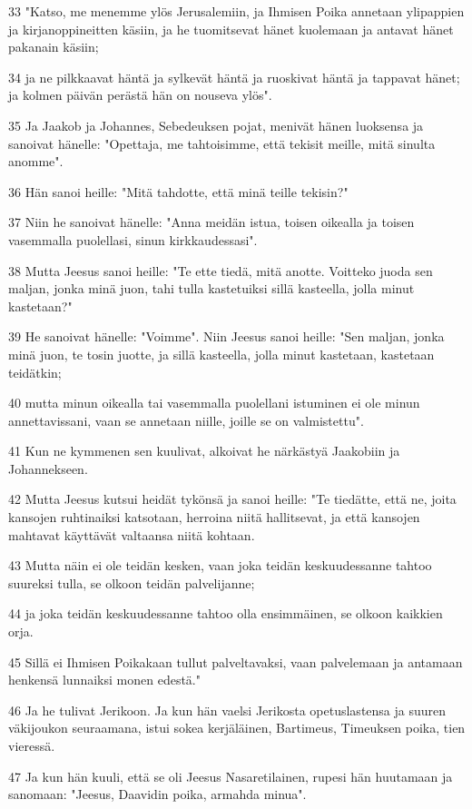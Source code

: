 \par 33 "Katso, me menemme ylös Jerusalemiin, ja Ihmisen Poika annetaan ylipappien ja kirjanoppineitten käsiin, ja he tuomitsevat hänet kuolemaan ja antavat hänet pakanain käsiin;
\par 34 ja ne pilkkaavat häntä ja sylkevät häntä ja ruoskivat häntä ja tappavat hänet; ja kolmen päivän perästä hän on nouseva ylös".
\par 35 Ja Jaakob ja Johannes, Sebedeuksen pojat, menivät hänen luoksensa ja sanoivat hänelle: "Opettaja, me tahtoisimme, että tekisit meille, mitä sinulta anomme".
\par 36 Hän sanoi heille: "Mitä tahdotte, että minä teille tekisin?"
\par 37 Niin he sanoivat hänelle: "Anna meidän istua, toisen oikealla ja toisen vasemmalla puolellasi, sinun kirkkaudessasi".
\par 38 Mutta Jeesus sanoi heille: "Te ette tiedä, mitä anotte. Voitteko juoda sen maljan, jonka minä juon, tahi tulla kastetuiksi sillä kasteella, jolla minut kastetaan?"
\par 39 He sanoivat hänelle: "Voimme". Niin Jeesus sanoi heille: "Sen maljan, jonka minä juon, te tosin juotte, ja sillä kasteella, jolla minut kastetaan, kastetaan teidätkin;
\par 40 mutta minun oikealla tai vasemmalla puolellani istuminen ei ole minun annettavissani, vaan se annetaan niille, joille se on valmistettu".
\par 41 Kun ne kymmenen sen kuulivat, alkoivat he närkästyä Jaakobiin ja Johannekseen.
\par 42 Mutta Jeesus kutsui heidät tykönsä ja sanoi heille: "Te tiedätte, että ne, joita kansojen ruhtinaiksi katsotaan, herroina niitä hallitsevat, ja että kansojen mahtavat käyttävät valtaansa niitä kohtaan.
\par 43 Mutta näin ei ole teidän kesken, vaan joka teidän keskuudessanne tahtoo suureksi tulla, se olkoon teidän palvelijanne;
\par 44 ja joka teidän keskuudessanne tahtoo olla ensimmäinen, se olkoon kaikkien orja.
\par 45 Sillä ei Ihmisen Poikakaan tullut palveltavaksi, vaan palvelemaan ja antamaan henkensä lunnaiksi monen edestä."
\par 46 Ja he tulivat Jerikoon. Ja kun hän vaelsi Jerikosta opetuslastensa ja suuren väkijoukon seuraamana, istui sokea kerjäläinen, Bartimeus, Timeuksen poika, tien vieressä.
\par 47 Ja kun hän kuuli, että se oli Jeesus Nasaretilainen, rupesi hän huutamaan ja sanomaan: "Jeesus, Daavidin poika, armahda minua".
